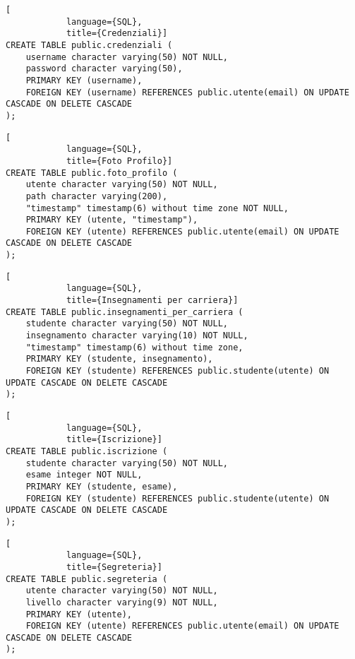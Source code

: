 \documentclass{article}
\begin{document}
\begin{enumerate}
        \begin{lstlisting}[
            language={SQL},
            title={Credenziali}]
CREATE TABLE public.credenziali (
    username character varying(50) NOT NULL,
    password character varying(50),
    PRIMARY KEY (username),
    FOREIGN KEY (username) REFERENCES public.utente(email) ON UPDATE CASCADE ON DELETE CASCADE
);
        \end{lstlisting}




        \begin{lstlisting}[
            language={SQL},
            title={Foto Profilo}]
CREATE TABLE public.foto_profilo (
    utente character varying(50) NOT NULL,
    path character varying(200),
    "timestamp" timestamp(6) without time zone NOT NULL,
    PRIMARY KEY (utente, "timestamp"),
    FOREIGN KEY (utente) REFERENCES public.utente(email) ON UPDATE CASCADE ON DELETE CASCADE
);
        \end{lstlisting}








        \begin{lstlisting}[
            language={SQL},
            title={Insegnamenti per carriera}]
CREATE TABLE public.insegnamenti_per_carriera (
    studente character varying(50) NOT NULL,
    insegnamento character varying(10) NOT NULL,
    "timestamp" timestamp(6) without time zone,
    PRIMARY KEY (studente, insegnamento),
    FOREIGN KEY (studente) REFERENCES public.studente(utente) ON UPDATE CASCADE ON DELETE CASCADE
);
        \end{lstlisting}

        \begin{lstlisting}[
            language={SQL},
            title={Iscrizione}]
CREATE TABLE public.iscrizione (
    studente character varying(50) NOT NULL,
    esame integer NOT NULL,
    PRIMARY KEY (studente, esame),
    FOREIGN KEY (studente) REFERENCES public.studente(utente) ON UPDATE CASCADE ON DELETE CASCADE
);
        \end{lstlisting}



        \begin{lstlisting}[
            language={SQL},
            title={Segreteria}]
CREATE TABLE public.segreteria (
    utente character varying(50) NOT NULL,
    livello character varying(9) NOT NULL,
    PRIMARY KEY (utente),
    FOREIGN KEY (utente) REFERENCES public.utente(email) ON UPDATE CASCADE ON DELETE CASCADE
);
        \end{lstlisting}



\end{enumerate}
\end{document}
